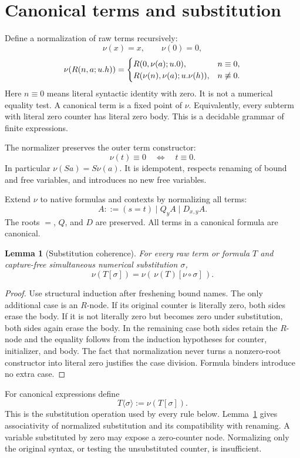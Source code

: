 \documentclass[11pt]{article}
\newtheorem{lemma}[theorem]{Lemma}
\theoremstyle{definition}\newtheorem{definition}[theorem]{Definition}
\newcommand{\norm}[1]{\nu(#1)}
\newcommand{\subc}[2]{#1\langle #2\rangle}
\newcommand{\lit}{\mathrel{\equiv}}
\begin{document}
\section{Canonical terms and substitution}

Define a normalization of raw terms recursively:
\[
\norm{x}=x,\qquad \norm{0}=0,
\]
\[
\norm{R(n,a;u.h)}=
\begin{cases}
R(0,\norm a;u.0),&n\lit0,\\
R(\norm n,\norm a;u.\norm h),&n\not\lit0.
\end{cases}
\]
Here \(n\lit0\) means literal syntactic identity with zero. It is not a numerical equality test. A canonical term is a fixed point of \(\nu\). Equivalently, every subterm with literal zero counter has literal zero body. This is a decidable grammar of finite expressions.

The normalizer preserves the outer term constructor:
\[
\norm t\lit0\quad\Longleftrightarrow\quad t\lit0.
\]
In particular \(\norm{Sa}=S\norm a\). It is idempotent, respects renaming of bound and free variables, and introduces no new free variables.

Extend \(\nu\) to native formulas and contexts by normalizing all terms:
\[
A::=(s=t)\mid Q_y A\mid D_{x,y}A.
\]
The roots \(=\), \(Q\), and \(D\) are preserved. All terms in a canonical formula are canonical.

\begin{lemma}[Substitution coherence]\label{cr:coherence}
For every raw term or formula \(T\) and capture-free simultaneous numerical substitution \(\sigma\),
\[
\norm{T[\sigma]}=
\norm{\,\norm T[\nu\circ\sigma]\,}.
\]
\end{lemma}
\begin{proof}
Use structural induction after freshening bound names. The only additional case is an \(R\)-node. If its original counter is literally zero, both sides erase the body. If it is not literally zero but becomes zero under substitution, both sides again erase the body. In the remaining case both sides retain the \(R\)-node and the equality follows from the induction hypotheses for counter, initializer, and body. The fact that normalization never turns a nonzero-root constructor into literal zero justifies the case division. Formula binders introduce no extra case.
\end{proof}

For canonical expressions define
\[
\subc T\sigma:=\norm{T[\sigma]}.
\]
This is the substitution operation used by every rule below. Lemma~\ref{cr:coherence} gives associativity of normalized substitution and its compatibility with renaming. A variable substituted by zero may expose a zero-counter node. Normalizing only the original syntax, or testing the unsubstituted counter, is insufficient.
\end{document}

